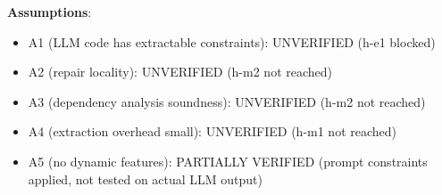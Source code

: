 \textbf{Assumptions}:
\begin{itemize}
\item A1 (LLM code has extractable constraints): UNVERIFIED (h-e1 blocked)
\item A2 (repair locality): UNVERIFIED (h-m2 not reached)
\item A3 (dependency analysis soundness): UNVERIFIED (h-m2 not reached)
\item A4 (extraction overhead small): UNVERIFIED (h-m1 not reached)
\item A5 (no dynamic features): PARTIALLY VERIFIED (prompt constraints applied, not tested on actual LLM output)
\end{itemize}
